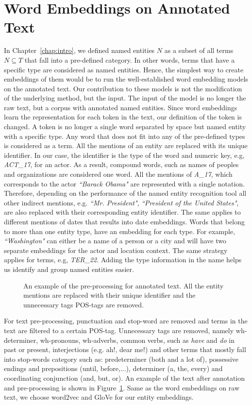 \section{Word Embeddings on Annotated Text}\label{sec:annotated}
In Chapter~\ref{chap:intro}, we defined named entities $N$ as a subset of all terms $N\subseteq T$ that fall into a pre-defined category. In other words, terms that have a specific type are considered as named entities. Hence, the simplest way to create embeddings of them would be to run the well-established word embedding models on the annotated text. Our contribution to these models is not the modification of the underlying method, but the input. The input of the model is no longer the raw text, but a corpus with annotated named entities. Since word embeddings learn the representation for each token in the text, our definition of the token is changed. A token is no longer a single word separated by space but named entity with a specific type. Any word that does not fit into any of the pre-defined types is considered as a term. All the mentions of an entity are replaced with its unique identifier. In our case, the identifier is the type of the word and numeric key, e.g,  \emph{ACT\_17}, for an actor. As a result, compound words, such as names of peoples and organizations are considered one word. All the mentions of  \emph{A\_17}, which corresponds to the actor  \emph{``Barack Obama"} are represented with a single notation. Therefore, depending on the performance of the named entity recognition tool all other indirect mentions, e.g. \emph{``Mr. President"}, \emph{``President of the United States"}, are also replaced with their corresponding entity identifier. The same applies to different mentions of dates that results into date embeddings. Words that belong to more than one entity type, have an embedding for each type. For example, \emph{``Washington"} can either be a name of a person or a city and will have two separate embeddings for the actor and location context. The same strategy applies for terms, e.g,  \emph{TER\_22}.  Adding the type information in the name helps us identify and group named entities easier. \\
\begin{figure}
\centering 
\resizebox{0.85\textwidth}{0.28\textwidth}{      

}
\caption{An example of the pre-processing for annotated text. All the entity mentions are replaced with their unique identifier and the unnecessary tags POS-tags are removed. }
\label{fig:annotation}
\end{figure}
For text pre-processing, punctuation and stop-word are removed and terms in the text are filtered to a certain POS-tag. Unnecessary tags are removed, namely  wh-determiner, wh-pronouns, wh-adverbs, common verbs, such as  \emph{have} and  \emph{do} in past or present, interjections (e.g. ah!, dear me!) and other terms that mostly fall into stop-words category such as: predeterminer (both and a lot of), possessive endings and prepositions (until, before,...), determiner (a, the, every) and coordinating conjunction (and, but, or). An example of the text after annotation and pre-processing is shown in Figure~\ref{fig:annotation}. Same as the word embeddings on raw text, we choose word2vec and GloVe for our entity embeddings. 

